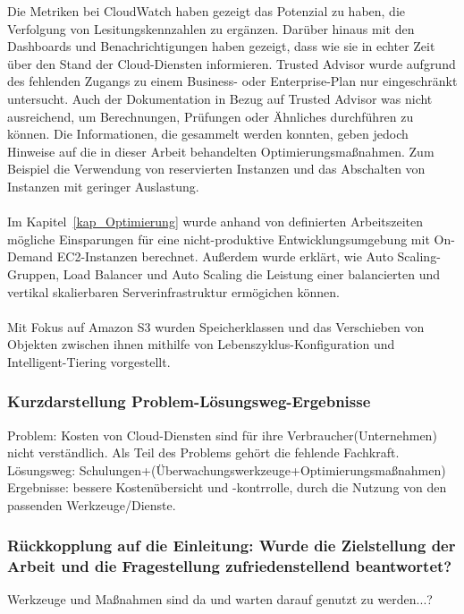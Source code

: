 %
Die Metriken bei CloudWatch haben gezeigt das Potenzial zu haben, die Verfolgung von Lesitungskennzahlen zu ergänzen. Darüber hinaus mit den Dashboards und Benachrichtigungen haben gezeigt, dass wie sie  in echter Zeit über den Stand der Cloud-Diensten informieren.
%
Trusted Advisor wurde aufgrund des fehlenden Zugangs zu einem Business- oder Enterprise-Plan nur eingeschränkt untersucht. 
Auch der Dokumentation in Bezug auf Trusted Advisor was nicht ausreichend, um Berechnungen, Prüfungen oder Ähnliches durchführen zu können. Die Informationen, die gesammelt werden konnten, geben jedoch Hinweise auf die in dieser Arbeit behandelten Optimierungsmaßnahmen.  Zum Beispiel die Verwendung von reservierten Instanzen und das Abschalten von Instanzen mit geringer Auslastung.
\\\\
Im Kapitel~\ref{kap_Optimierung} wurde anhand von definierten Arbeitszeiten mögliche Einsparungen für eine nicht-produktive Entwicklungsumgebung mit On-Demand EC2-Instanzen berechnet. Außerdem wurde erklärt, wie Auto Scaling-Gruppen, Load Balancer und Auto Scaling die Leistung einer balancierten und vertikal skalierbaren Serverinfrastruktur ermögichen können.
\\\\
Mit Fokus auf Amazon S3 wurden Speicherklassen und das Verschieben von Objekten zwischen ihnen mithilfe von Lebenszyklus-Konfiguration und Intelligent-Tiering vorgestellt.
\subsubsection*{Kurzdarstellung Problem-Lösungsweg-Ergebnisse}
Problem: Kosten von Cloud-Diensten sind für ihre Verbraucher(Unternehmen) nicht verständlich. Als Teil des Problems gehört die fehlende Fachkraft. \\
Lösungsweg: Schulungen+(Überwachungswerkzeuge+Optimierungsmaßnahmen) \\ Ergebnisse: bessere Kostenübersicht und -kontrrolle, durch die Nutzung von den passenden Werkzeuge/Dienste.
\\
\subsubsection*{Rückkopplung auf die Einleitung: Wurde die Zielstellung der Arbeit und die Fragestellung zufriedenstellend beantwortet?}
Werkzeuge und Maßnahmen sind da und warten darauf genutzt zu werden...?

